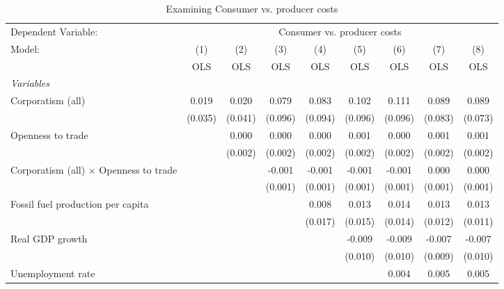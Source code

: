 
\begin{table}[htbp]
   \caption{Examining Consumer vs. producer costs}
   \centering
   \begin{tabular}{lcccccccc}
      \toprule
      Dependent Variable: & \multicolumn{8}{c}{Consumer vs. producer costs}\\
      Model:                                        & (1)     & (2)     & (3)     & (4)     & (5)     & (6)     & (7)     & (8)\\  
                                                    &  OLS    & OLS     & OLS     & OLS     & OLS     & OLS     & OLS     & OLS\\  
      \midrule
      \emph{Variables}\\
      Corporatism (all)                             & 0.019   & 0.020   & 0.079   & 0.083   & 0.102   & 0.111   & 0.089   & 0.089\\   
                                                    & (0.035) & (0.041) & (0.096) & (0.094) & (0.096) & (0.096) & (0.083) & (0.073)\\   
      Openness to trade                             &         & 0.000   & 0.000   & 0.000   & 0.001   & 0.000   & 0.001   & 0.001\\   
                                                    &         & (0.002) & (0.002) & (0.002) & (0.002) & (0.002) & (0.002) & (0.002)\\   
      Corporatism (all) $\times$ Openness to trade  &         &         & -0.001  & -0.001  & -0.001  & -0.001  & 0.000   & 0.000\\   
                                                    &         &         & (0.001) & (0.001) & (0.001) & (0.001) & (0.001) & (0.001)\\   
      Fossil fuel production per capita             &         &         &         & 0.008   & 0.013   & 0.014   & 0.013   & 0.013\\   
                                                    &         &         &         & (0.017) & (0.015) & (0.014) & (0.012) & (0.011)\\   
      Real GDP growth                               &         &         &         &         & -0.009  & -0.009  & -0.007  & -0.007\\   
                                                    &         &         &         &         & (0.010) & (0.010) & (0.009) & (0.010)\\   
      Unemployment rate                             &         &         &         &         &         & 0.004   & 0.005   & 0.005\\   

\end{tabular}
\end{table}
